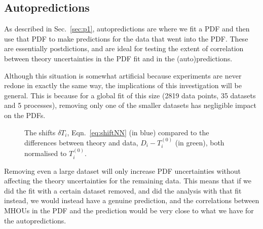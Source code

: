 \subsection{Autopredictions}
\label{subsec:autopredictions}
As described in Sec.~\ref{sec:p1}, autopredictions are where we fit a PDF and then use that PDF to make predictions for the data that went into the PDF. These are essentially postdictions, and are ideal for testing the extent of correlation between theory uncertainties in the PDF fit and in the (auto)predictions. 

Although this situation is somewhat artificial because experiments are never redone in exactly the same way, the implications of this investigation will be general. This is because for a global fit of this size (2819 data points, 35 datasets and 5 processes), removing only one of the smaller datasets has negligible impact on the PDFs. 
\begin{figure}[H]
    \begin{center}
    \end{center}
  \vspace{-0.55cm}
  \caption{The shifts $\delta T_i$, Eqn.~\ref{eq:shiftNN} (in blue) compared to the differences between theory and data, $D_i-T^{(0)}_i$ (in green), both normalised to $T^{(0)}_i$.} 
  \label{fig:shifts}
\end{figure}
Removing even a large dataset will only increase PDF uncertainties without affecting the theory uncertainties for the remaining data. This means that if we did the fit with a certain dataset removed, and did the analysis with that fit instead, we would instead have a genuine prediction, and the correlations between MHOUs in the PDF and the prediction would be very close to what we have for the autopredictions.

